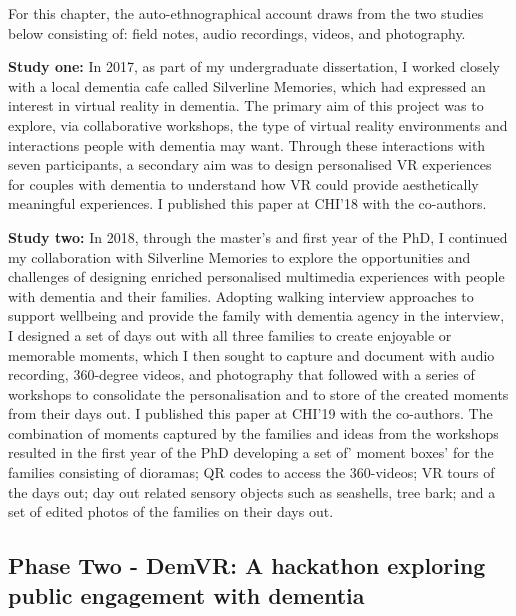 For this chapter, the auto-ethnographical account draws from the two studies below consisting of: field notes, audio recordings, videos, and photography. 

\textbf{Study one:} In 2017, as part of my undergraduate dissertation, I worked closely with a local dementia cafe called Silverline Memories, which had expressed an interest in virtual reality in dementia. The primary aim of this project was to explore, via collaborative workshops, the type of virtual reality environments and interactions people with dementia may want. Through these interactions with seven participants, a secondary aim was to design personalised VR experiences for couples with dementia to understand how VR could provide aesthetically meaningful experiences. I published this paper at CHI'18 with the co-authors.

\textbf{Study two:} In 2018, through the master's and first year of the PhD, I continued my collaboration with Silverline Memories to explore the opportunities and challenges of designing enriched personalised multimedia experiences with people with dementia and their families. Adopting walking interview approaches to support wellbeing and provide the family with dementia agency in the interview, I designed a set of days out with all three families to create enjoyable or memorable moments, which I then sought to capture and document with audio recording, 360-degree videos, and photography that followed with a series of workshops to consolidate the personalisation and to store of the created moments from their days out. I published this paper at CHI'19 with the co-authors. The combination of moments captured by the families and ideas from the workshops resulted in the first year of the PhD developing a set of' moment boxes' for the families consisting of dioramas; QR codes to access the 360-videos; VR tours of the days out; day out related sensory objects such as seashells, tree bark; and a set of edited photos of the families on their days out.

\subsection{Phase Two - DemVR: A hackathon exploring public engagement with dementia}

